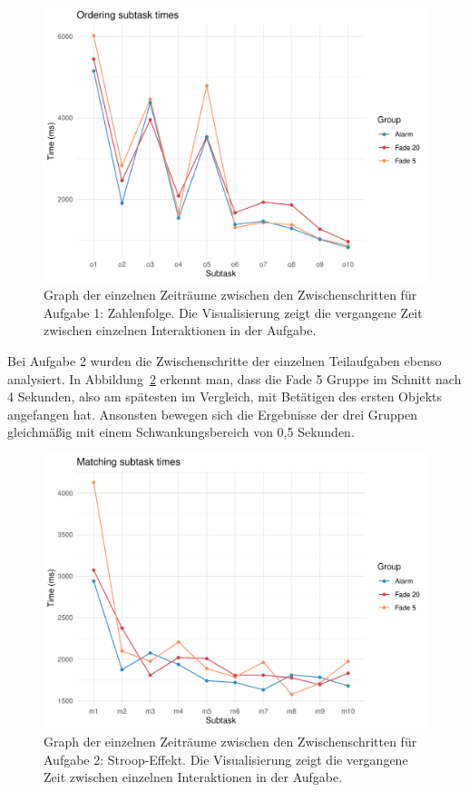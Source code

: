 \begin{figure}[H]
	\centering
	\includegraphics[width=\textwidth]{./_StudyResults/timeTask1}
	\caption{Graph der einzelnen Zeiträume zwischen den Zwischenschritten für Aufgabe 1: Zahlenfolge. Die Visualisierung zeigt die vergangene Zeit zwischen einzelnen Interaktionen in der Aufgabe.}
	\label{fig:timeTask1}
\end{figure}

Bei Aufgabe 2 wurden die Zwischenschritte der einzelnen Teilaufgaben ebenso analysiert. In Abbildung~\ref{fig:timeTask2} erkennt man, dass die Fade 5 Gruppe im Schnitt nach 4 Sekunden, also am spätesten im Vergleich, mit Betätigen des ersten Objekts angefangen hat. Ansonsten bewegen sich die Ergebnisse der drei Gruppen gleichmäßig mit einem Schwankungsbereich von 0,5 Sekunden.

\begin{figure}[H]
	\centering
	\includegraphics[width=\textwidth]{./_StudyResults/timeTask2}
	\caption{Graph der einzelnen Zeiträume zwischen den Zwischenschritten für Aufgabe 2: Stroop-Effekt. Die Visualisierung zeigt die vergangene Zeit zwischen einzelnen Interaktionen in der Aufgabe.}
	\label{fig:timeTask2}
\end{figure}

